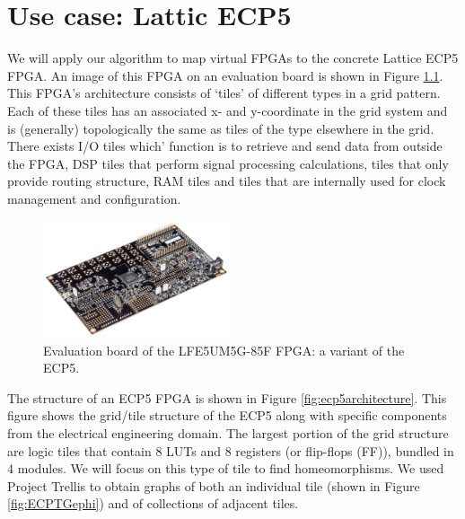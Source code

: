 \chapter{Use case: Lattic ECP5}
We will apply our algorithm to map virtual FPGAs to the concrete Lattice ECP5 FPGA. An image of this FPGA on an evaluation board is shown in Figure \ref{fig:evaluationboard}. This FPGA's architecture consists of `tiles' of different types in a grid pattern. Each of these tiles has an associated x- and y-coordinate in the grid system and is (generally) topologically the same as tiles of the type elsewhere in the grid. There exists I/O tiles which' function is to retrieve and send data from outside the FPGA, DSP tiles that perform signal processing calculations, tiles that only provide routing structure, RAM tiles and tiles that are internally used for clock management and configuration.

\begin{figure}
\centering
\includegraphics[width=0.5\textwidth]{images/ECP5.png}
\caption[Evaluation board of the LFE5UM5G-85F FPGA: a variant of the ECP5.]{Evaluation board of the LFE5UM5G-85F FPGA: a variant of the ECP5.\footnotemark}
\label{fig:evaluationboard}
\end{figure}

The structure of an ECP5 FPGA is shown in Figure \ref{fig:ecp5architecture}. This figure shows the grid/tile structure of the ECP5 along with specific components from the electrical engineering domain. The largest portion of the grid structure are logic tiles that contain 8 LUTs and 8 registers (or flip-flops (FF)), bundled in 4 modules. We will focus on this type of tile to find homeomorphisms. We used Project Trellis \cite{trellis} to obtain graphs of both an individual tile (shown in Figure \ref{fig:ECPTGephi}) and of collections of adjacent tiles.

